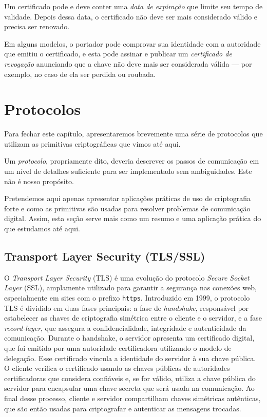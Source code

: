 Um certificado pode e deve conter uma {\em data de expiração} que limite seu tempo de validade.
Depois dessa data, o certificado não deve ser mais considerado válido e precisa ser renovado.

Em alguns modelos, o portador pode comprovar sua identidade com a autoridade que emitiu o certificado, e esta pode assinar e publicar um {\em certificado de revogação} anunciando que a chave não deve mais ser considerada válida — por exemplo, no caso de ela ser perdida ou roubada.

\section{Protocolos}
\label{sec:protocolos}

Para fechar este capítulo, apresentaremos brevemente uma série de protocolos que utilizam as primitivas criptográficas que vimos até aqui.

Um {\em protocolo}, propriamente dito, deveria descrever os passos de comunicação em um nível de detalhes suficiente para ser implementado sem ambiguidades.
Este não é nosso propósito.

Pretendemos aqui apenas apresentar aplicações práticas de uso de criptografia forte e como as primitivas são usadas para resolver problemas de comunicação digital.
Assim, esta seção serve mais como um resumo e uma aplicação prática do que estudamos até aqui.

\subsection{Transport Layer Security (TLS/SSL)}

O {\em Transport Layer Security} (TLS) é uma evolução do protocolo {\em Secure Socket Layer} (SSL), amplamente utilizado para garantir a segurança nas conexões web, especialmente em sites com o prefixo {\tt https}.
Introduzido em 1999, o protocolo TLS é dividido em duas fases principais:
a fase de {\em handshake}, responsável por estabelecer as chaves de criptografia simétrica entre o cliente e o servidor, e a fase {\em record-layer}, que assegura a confidencialidade, integridade e autenticidade da comunicação.
Durante o handshake, o servidor apresenta um certificado digital, que foi emitido por uma autoridade certificadora utilizando o modelo de delegação.
Esse certificado vincula a identidade do servidor à sua chave pública.
O cliente verifica o certificado usando as chaves públicas de autoridades certificadoras que considera confiáveis e, se for válido, utiliza a chave pública do servidor para encapsular uma chave secreta que será usada na comunicação.
Ao final desse processo, cliente e servidor compartilham chaves simétricas autênticas, que são então usadas para criptografar e autenticar as mensagens trocadas.

